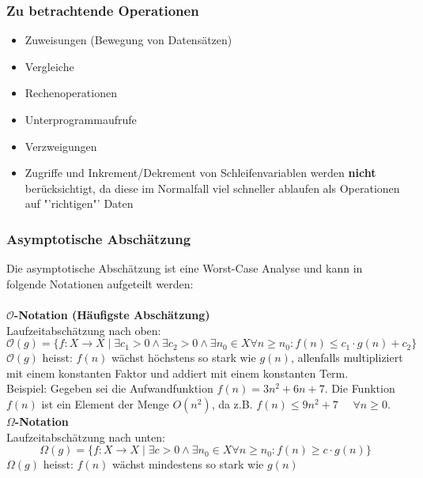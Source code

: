 \subsubsection{Zu betrachtende Operationen}
\begin{multicols}{2}
    \begin{itemize}
        \item Zuweisungen (Bewegung von Datensätzen)
        \item Vergleiche
        \item Rechenoperationen
        \item Unterprogrammaufrufe
        \item Verzweigungen
    \end{itemize}
		\vfill\null
		\columnbreak
		\begin{itemize}
			\item Zugriffe und Inkrement/Dekrement von Schleifenvariablen werden \textbf{nicht} berücksichtigt, da diese im Normalfall viel schneller ablaufen als Operationen auf "'richtigen"' Daten
		\end{itemize}
\end{multicols}

\subsubsection{Asymptotische Abschätzung}
Die asymptotische Abschätzung ist eine Worst-Case Analyse und kann in folgende Notationen aufgeteilt werden:\\
\\
\textbf{$\mathcal{O}$-Notation (Häufigste Abschätzung)}\\
Laufzeitabschätzung nach oben:
\begin{equation}
	\mathcal{O}(g) = \{f: X \rightarrow X \mid \exists {c_1}>0 \wedge \exists c_2>0 \wedge \exists n_0 \in X  \forall n \geq n_0 : f(n) \leq c_1\cdot g(n) + c_2\}
\end{equation}
$\mathcal{O}(g)$ heisst: $f(n)$ wächst höchstens so stark wie $g(n)$, allenfalls multipliziert mit einem konstanten Faktor und addiert mit einem konstanten Term.\\
Beispiel: Gegeben sei die Aufwandfunktion $f(n)=3n^2 + 6n + 7$. Die Funktion $f(n)$ ist ein Element der Menge $O(n^2)$, da z.B. $f(n) \leq 9n^2 + 7$ \ \ $\forall n \geq 0$.\\

\textbf{$\Omega$-Notation}\\
Laufzeitabschätzung nach unten:
\begin{equation}
\Omega(g) = \{f: X \rightarrow X \mid \exists c>0 \wedge \exists n_0 \in X  \forall n \geq n_0 : f(n) \geq c\cdot g(n)\}
\end{equation}
$\Omega(g)$ heisst: $f(n)$ wächst mindestens so stark wie $g(n)$\\

